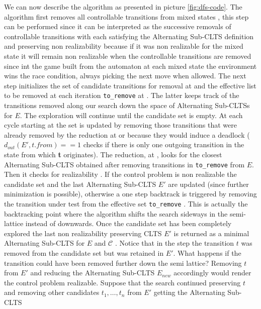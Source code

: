 We can now describe the algorithm as
presented in picture \ref{fig:dfs-code}. The algorithm first removes all controllable transitions from
mixed states , this step can be performed since it
can be interpreted as the successive removals of controllable 
transitions with each satisfying the Alternating Sub-CLTS definition 
and preserving non realizability because if it was non realizable
for the mixed state it will remain non realizable when the controllable transitions are removed since int the game built from
the automaton at each mixed state the environment
wins the race condition, always picking the next move when allowed.
The next step initializes the set of 
candidate transitions
for removal at  and the effective list
to be removed at each iteration \texttt{to\_remove} at
.  The latter keeps track of the transitions
removed along our search down the space of
Alternating Sub-CLTSs for $E$.  The exploration
will continue until the candidate set is empty.
At each cycle starting at  the set is updated  by 
removing those transitions that were already removed by the reduction
at  or because they would induce a deadlock 
($d_{out}(E', t.from) == 1$ checks if there is only one
outgoing transition in the state from which \textbf{t} originates).
The
reduction, at , looks for the closest
Alternating Sub-CLTS obtained after removing 
transitions in \texttt{to\_remove} from $E$.
Then it checks for realizability .  If the control problem is non
realizable the candidate set and the last 
Alternating Sub-CLTS $E'$ are updated (since further minimization is 
possible), otherwise a one step backtrack
is triggered by removing the transition under test from
the effective set \texttt{to\_remove} .
This is actually the backtracking point where the algorithm
shifts the search sideways in the semi-lattice instead of downwards.
Once the candidate set has been completely explored
the last non realizability preserving CLTS $E'$ is
returned as a minimal Alternating Sub-CLTS
for $E$ and $\mathcal{C}$ .
Notice that
in the step  the transition $t$ was removed
from the candidate set but was retained in $E'$.  What happens if
the transition could have been removed further down the semi lattice?  Removing $t$ from $E'$ and reducing the Alternating Sub-CLTS 
$E_{new}$ accordingly would render the control problem realizable.  Suppose that
the search continued preserving $t$ and removing other candidates
$t_1, \ldots, t_n$ from $E'$ getting the Alternating Sub-CLTS
